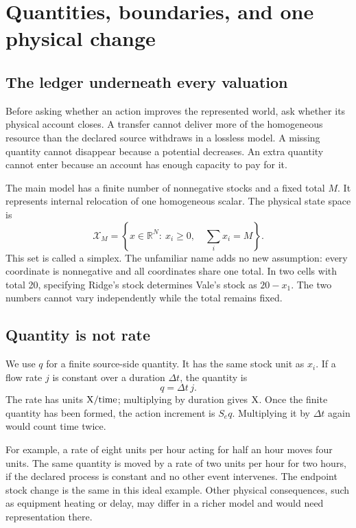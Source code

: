 \chapter{Quantities, boundaries, and one physical change}\label{ch:conservation}

\section{The ledger underneath every valuation}
Before asking whether an action improves the represented world, ask whether its physical account closes. A transfer cannot deliver more of the homogeneous resource than the declared source withdraws in a lossless model. A missing quantity cannot disappear because a potential decreases. An extra quantity cannot enter because an account has enough capacity to pay for it.

The main model has a finite number of nonnegative stocks and a fixed total \(M\). It represents internal relocation of one homogeneous scalar. The physical state space is
\begin{equation}
 \mathcal{X}_M=\left\{x\in\mathbb{R}^N:\ x_i\geq0,\quad
                         \sum_i x_i=M\right\}.
\end{equation}
This set is called a simplex. The unfamiliar name adds no new assumption: every coordinate is nonnegative and all coordinates share one total. In two cells with total 20, specifying Ridge's stock determines Vale's stock as \(20-x_1\). The two numbers cannot vary independently while the total remains fixed.

\section{Quantity is not rate}
We use \(q\) for a finite source-side quantity. It has the same stock unit as \(x_i\). If a flow rate \(j\) is constant over a duration \(\Delta t\), the quantity is
\begin{equation}
 q=\Delta t\,j.
\end{equation}
The rate has units \(\mathrm{X}/\text{time}\); multiplying by duration gives \(\mathrm{X}\). Once the finite quantity has been formed, the action increment is \(S_e q\). Multiplying it by \(\Delta t\) again would count time twice.

For example, a rate of eight units per hour acting for half an hour moves four units. The same quantity is moved by a rate of two units per hour for two hours, if the declared process is constant and no other event intervenes. The endpoint stock change is the same in this ideal example. Other physical consequences, such as equipment heating or delay, may differ in a richer model and would need representation there.

